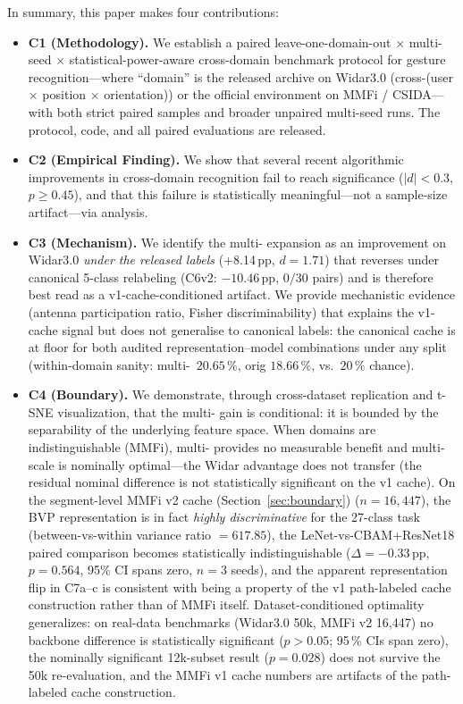 \documentclass[11pt]{article}
\theoremstyle{definition}
\newcommand{\BVP}{\text{BVP}}
\newcommand{\CSI}{\text{CSI}}
\newcommand{\MDE}{\text{MDE}}
\newcommand{\Rx}{\text{Rx}}
\begin{document}
In summary, this paper makes four contributions:
\begin{itemize}
    \item \textbf{C1 (Methodology).} We establish a paired leave-one-domain-out $\times$ multi-seed $\times$ statistical-power-aware cross-domain benchmark protocol for \CSI{} gesture recognition---where ``domain'' is the released archive on Widar3.0 (cross-(user $\times$ position $\times$ orientation)) or the official environment on MMFi / CSIDA---with both strict paired samples and broader unpaired multi-seed runs. The protocol, code, and all paired evaluations are released.
    \item \textbf{C2 (Empirical Finding).} We show that several recent algorithmic improvements in \CSI{} cross-domain recognition fail to reach significance ($|d| < 0.3$, $p \geq 0.45$), and that this failure is statistically meaningful---not a sample-size artifact---via \MDE{} analysis.
    \item \textbf{C3 (Mechanism).} We identify the \BVP{} multi-\Rx{} expansion as an improvement on Widar3.0 \emph{under the released labels} (+8.14\,pp, $d = 1.71$) that reverses under canonical 5-class relabeling (C6v2: $-10.46$\,pp, $0/30$ pairs) and is therefore best read as a v1-cache-conditioned artifact. We provide mechanistic evidence (antenna participation ratio, Fisher discriminability) that explains the v1-cache signal but does not generalise to canonical labels: the canonical cache is at floor for both audited representation--model combinations under any split (within-domain sanity: multi-\Rx\ $20.65\,\%$, orig $18.66\,\%$, vs.\ $20\,\%$ chance).
    \item \textbf{C4 (Boundary).} We demonstrate, through cross-dataset replication and t-SNE visualization, that the multi-\Rx{} gain is conditional: it is bounded by the separability of the underlying feature space. When domains are indistinguishable (MMFi), multi-\Rx{} provides no measurable benefit and multi-scale is nominally optimal---the Widar advantage does not transfer (the residual nominal difference is not statistically significant on the v1 cache). On the segment-level MMFi v2 cache (Section~\ref{sec:boundary}) ($n=16{,}447$), the BVP representation is in fact \emph{highly discriminative} for the 27-class task (between-vs-within variance ratio $= 617.85$), the LeNet-vs-CBAM+ResNet18 paired comparison becomes statistically indistinguishable ($\Delta = -0.33$\,pp, $p = 0.564$, 95\% CI spans zero, $n=3$ seeds), and the apparent representation flip in C7a--c is consistent with being a property of the v1 path-labeled cache construction rather than of MMFi itself. Dataset-conditioned optimality generalizes: on real-data benchmarks (Widar3.0 50k, MMFi v2 16{,}447) no backbone difference is statistically significant ($p > 0.05$; 95\,\% CIs span zero), the nominally significant 12k-subset result ($p = 0.028$) does not survive the 50k re-evaluation, and the MMFi v1 cache numbers are artifacts of the path-labeled cache construction.
\end{itemize}
\end{document}
